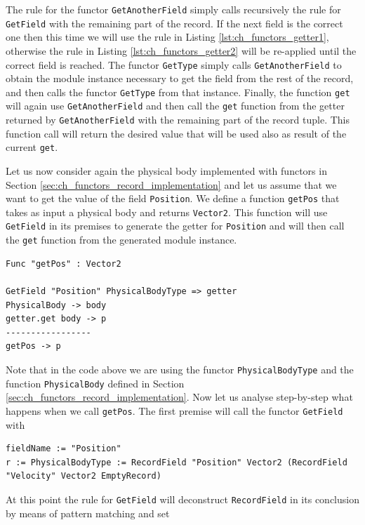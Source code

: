 \noindent
The rule for the functor \texttt{GetAnotherField} simply calls recursively the rule for \texttt{GetField} with the remaining part of the record. If the next field is the correct one then this time we will use the rule in Listing \ref{lst:ch_functors_getter1}, otherwise the rule in Listing \ref{lst:ch_functors_getter2} will be re-applied until the correct field is reached. The functor \texttt{GetType} simply calls \texttt{GetAnotherField} to obtain the module instance necessary to get the field from the rest of the record, and then calls the functor \texttt{GetType} from that instance. Finally, the function \texttt{get} will again use \texttt{GetAnotherField} and then call the \texttt{get} function from the getter returned by \texttt{GetAnotherField} with the remaining part of the record tuple. This function call will return the desired value that will be used also as result of the current \texttt{get}.

Let us now consider again the physical body implemented with functors in Section \ref{sec:ch_functors_record_implementation} and let us assume that we want to get the value of the field \texttt{Position}. We define a function \texttt{getPos} that takes as input a physical body and returns \texttt{Vector2}. This function will use \texttt{GetField} in its premises to generate the getter for \texttt{Position} and will then call the \texttt{get} function from the generated module instance.

\begin{lstlisting}[caption = Getter for the Position field, label = lst:ch_functors_position_getter]
Func "getPos" : Vector2

GetField "Position" PhysicalBodyType => getter
PhysicalBody -> body
getter.get body -> p
-----------------
getPos -> p
\end{lstlisting}

\noindent
Note that in the code above we are using the functor \texttt{PhysicalBodyType} and the function \texttt{PhysicalBody} defined in Section \ref{sec:ch_functors_record_implementation}. Now let us analyse step-by-step what happens when we call \texttt{getPos}. The first premise will call the functor \texttt{GetField} with 

\begin{lstlisting}
fieldName := "Position"
r := PhysicalBodyType := RecordField "Position" Vector2 (RecordField "Velocity" Vector2 EmptyRecord)
\end{lstlisting}

\noindent
At this point the rule for \texttt{GetField} will deconstruct \texttt{RecordField} in its conclusion by means of pattern matching and set 

